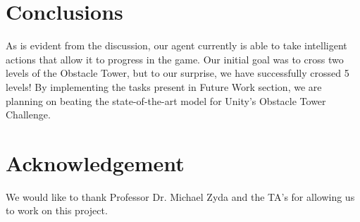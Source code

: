 \documentclass[conference]{IEEEtran}
\begin{document}
\section{Conclusions}

As is evident from the discussion, our agent currently is able to take intelligent actions that allow it to progress in the game. Our initial goal was to cross two levels of the Obstacle Tower, but to our surprise, we have successfully crossed 5 levels! By implementing the tasks present in Future Work section, we are planning on beating the state-of-the-art model for Unity's Obstacle Tower Challenge.

\section{Acknowledgement}

We would like to thank Professor Dr. Michael Zyda and the TA's for allowing us to work on this project.
\end{document}

